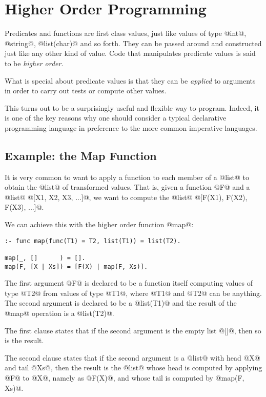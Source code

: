 
\chapter{Higher Order Programming}

Predicates and functions are first class values, just like values of
type @int@, @string@, @list(char)@ and so forth.  They can be
passed around and constructed just like any other kind of value.  Code
that manipulates predicate values is said to be \emph{higher order}.


What is special about predicate values is that they can be
\emph{applied} to arguments in order to carry out tests or compute other
values.

This turns out to be a surprisingly useful and flexible way to program.
Indeed, it is one of the key reasons why one should consider a typical
declarative programming language in preference to the more common
imperative languages.

\section{Example: the Map Function}

It is very common to want to apply a function to each member of a @list@
to obtain the @list@ of transformed values.  That is, given a function
@F@ and a @list@ @[X1, X2, X3, ...]@, we want to compute the @list@
@[F(X1), F(X2), F(X3), ...]@.

We can achieve this with the higher order function @map@:
\begin{verbatim}
:- func map(func(T1) = T2, list(T1)) = list(T2).

map(_, []      ) = [].
map(F, [X | Xs]) = [F(X) | map(F, Xs)].
\end{verbatim}
The first argument @F@ is declared to be a function itself computing
values of type @T2@ from values of type @T1@, where @T1@ and @T2@ can be
anything.  The second argument is declared to be a @list(T1)@ and the
result of the @map@ operation is a @list(T2)@.

The first clause states that if the second argument is the empty list
@[]@, then so is the result.

The second clause states that if the second argument is a @list@ with head
@X@ and tail @Xs@, then the result is the @list@ whose head is computed by
applying @F@ to @X@, namely as @F(X)@, and whose tail is computed by
@map(F, Xs)@.


